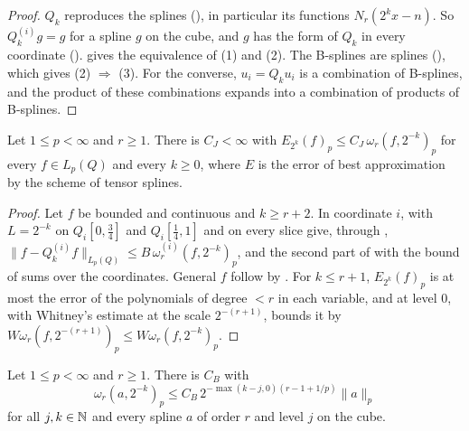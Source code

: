 \begin{proof}
\leanok
$Q_k$ reproduces the splines (), in particular its functions
$N_r(2^k x - n)$. So $Q_k^{(i)} g = g$ for a spline $g$ on the cube, and $g$ has the form of $Q_k$
in every coordinate ().  gives the equivalence of
(1) and (2). The B-splines are splines (), which gives (2)
$\Rightarrow$ (3). For the converse, $u_i = Q_k u_i$ is a combination of B-splines, and the
product of these combinations expands into a combination of products of B-splines.
\end{proof}

\begin{theorem}
\label{thm:cube-spline-jackson}
\leanok
{}
Let $1 \leq p < \infty$ and $r \geq 1$. There is $C_J < \infty$ with
$E_{2^k}(f)_p \leq C_J \, \omega_r(f, 2^{-k})_p$ for every $f \in L_p(Q)$ and every $k \geq 0$,
where $E$ is the error of best approximation by the scheme of tensor splines.
\end{theorem}

\begin{proof}
\leanok
Let $f$ be bounded and continuous and $k \geq r + 2$. In coordinate $i$,
 with $L = 2^{-k}$ on $Q_i[0, \tfrac34]$ and $Q_i[\tfrac14, 1]$
and  on every slice give, through ,
$\|f - Q_k^{(i)} f\|_{L_p(Q)} \leq B \, \omega_r^{(i)}(f, 2^{-k})_p$, and the second part of
 with the bound of  sums over the coordinates. General
$f$ follow by . For $k \leq r + 1$, $E_{2^k}(f)_p$ is at most the error of
the polynomials of degree $< r$ in each variable, and  at level $0$, with
Whitney's estimate at the scale $2^{-(r+1)}$, bounds it by $W \omega_r(f, 2^{-(r+1)})_p \leq
W \omega_r(f, 2^{-k})_p$.
\end{proof}

\begin{theorem}
\label{thm:cube-spline-inverse}
\leanok
{}
Let $1 \leq p < \infty$ and $r \geq 1$. There is $C_B$ with
\[
  \omega_r(a, 2^{-k})_p \leq C_B \, 2^{-\max(k - j, 0)(r - 1 + 1/p)} \|a\|_p
\]
for all $j, k \in \mathbb{N}$ and every spline $a$ of order $r$ and level $j$ on the cube.
\end{theorem}

